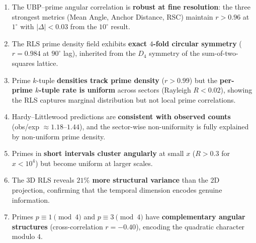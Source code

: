 \documentclass[11pt,a4paper]{article}
\theoremstyle{definition}
\begin{document}
\begin{enumerate}
    \item The UBP--prime angular correlation is \textbf{robust at fine
          resolution}: the three strongest metrics (Mean Angle, Anchor
          Distance, RSC) maintain $r > 0.96$ at $1^{\circ}$ with $|\Delta| <
          0.03$ from the $10^{\circ}$ result.

    \item The RLS prime density field exhibits \textbf{exact $4$-fold circular
          symmetry} ($r = 0.984$ at $90^{\circ}$ lag), inherited from the
          $D_4$ symmetry of the sum-of-two-squares lattice.

    \item Prime $k$-tuple \textbf{densities track prime density} ($r > 0.99$)
          but the \textbf{per-prime $k$-tuple rate is uniform} across sectors
          (Rayleigh $R < 0.02$), showing the RLS captures marginal
          distribution but not local prime correlations.

    \item Hardy--Littlewood predictions are \textbf{consistent with observed
          counts} (obs/exp $\approx 1.18$--$1.44$), and the sector-wise
          non-uniformity is fully explained by non-uniform prime density.

    \item Primes in \textbf{short intervals cluster angularly} at small
          $x$ ($R > 0.3$ for $x < 10^4$) but become uniform at larger
          scales.

    \item The $3$D RLS reveals \textbf{$21\%$ more structural variance} than
          the $2$D projection, confirming that the temporal dimension
          encodes genuine information.

    \item Primes $p \equiv 1 \pmod{4}$ and $p \equiv 3 \pmod{4}$ have
          \textbf{complementary angular structures} (cross-correlation
          $r = -0.40$), encoding the quadratic character modulo $4$.
\end{enumerate}
\end{document}
